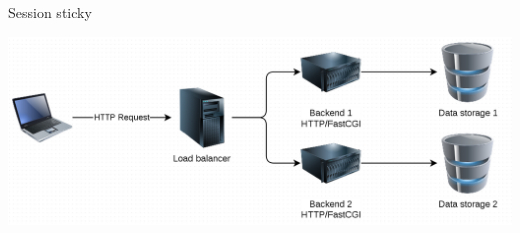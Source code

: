 \begin{frame}{Session sticky}
  \begin{center}
    \includegraphics[width=\textwidth,keepaspectratio]{sources/images/lb_session_sticky.png}
  \end{center}
\end{frame}